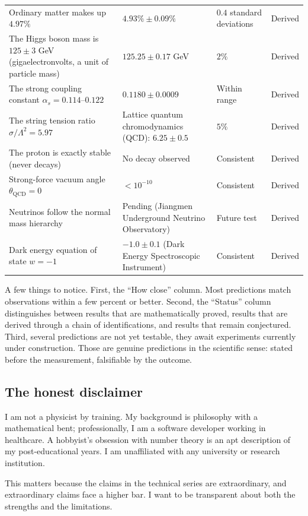 \begin{center}
\begin{tabular}{p{5.2cm} p{3.5cm} p{2cm} l}
Ordinary matter makes up $4.97\%$
  & $4.93\% \pm 0.09\%$ & $0.4$ standard deviations & Derived \\[4pt]
The Higgs boson mass is $125 \pm 3$ GeV
  (gigaelectronvolts, a unit of particle mass)
  & $125.25 \pm 0.17$ GeV & $2\%$ & Derived \\[4pt]
The strong coupling constant $\alpha_s = 0.114$--$0.122$
  & $0.1180 \pm 0.0009$ & Within range & Derived \\[4pt]
The string tension ratio $\sigma/\Lambda^2 = 5.97$
  & Lattice quantum chromodynamics (QCD): $6.25 \pm 0.5$ & $5\%$ & Derived \\[4pt]
The proton is exactly stable (never decays)
  & No decay observed & Consistent & Derived \\[4pt]
Strong-force vacuum angle $\theta_{\mathrm{QCD}} = 0$
  & $< 10^{-10}$ & Consistent & Derived \\[4pt]
Neutrinos follow the normal mass hierarchy
  & Pending (Jiangmen Underground Neutrino Observatory) & Future test & Derived \\[4pt]
Dark energy equation of state $w = -1$
  & $-1.0 \pm 0.1$ (Dark Energy Spectroscopic Instrument) & Consistent & Derived \\
\bottomrule
\end{tabular}
\end{center}

\noindent
A few things to notice. First, the ``How close'' column. Most
predictions match observations within a few percent or better. Second,
the ``Status'' column distinguishes between results that are
mathematically proved, results that are derived through a chain of
identifications, and results that remain conjectured. Third, several
predictions are not yet testable, they await experiments currently
under construction. Those are genuine predictions in the scientific
sense: stated before the measurement, falsifiable by the outcome.


\subsection*{The honest disclaimer}

I am not a physicist by training. My background is philosophy with a
mathematical bent; professionally, I am a software developer working
in healthcare. A hobbyist's obsession with number theory is an apt
description of my post-educational years. I am unaffiliated with any
university or research institution.

This matters because the claims in the technical series are
extraordinary, and extraordinary claims face a higher bar. I want to
be transparent about both the strengths and the limitations.

